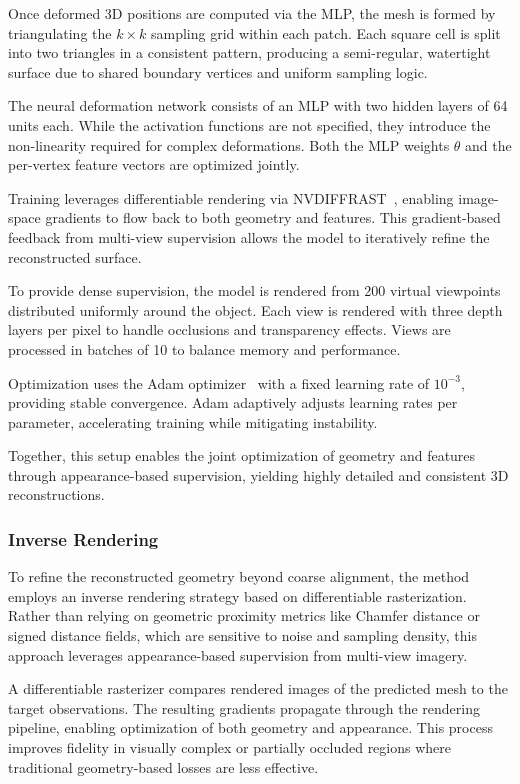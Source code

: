 Once deformed 3D positions are computed via the MLP, the mesh is formed by triangulating the $k \times k$ sampling grid within each patch.
Each square cell is split into two triangles in a consistent pattern, producing a semi-regular, watertight surface due to shared boundary vertices and uniform sampling logic.

The neural deformation network consists of an MLP with two hidden layers of 64 units each.
While the activation functions are not specified, they introduce the non-linearity required for complex deformations.
Both the MLP weights $\theta$ and the per-vertex feature vectors are optimized jointly.

Training leverages differentiable rendering via NVDIFFRAST~\cite{niemeyer2020}, enabling image-space gradients to flow back to both geometry and features.
This gradient-based feedback from multi-view supervision allows the model to iteratively refine the reconstructed surface.

To provide dense supervision, the model is rendered from 200 virtual viewpoints distributed uniformly around the object.
Each view is rendered with three depth layers per pixel to handle occlusions and transparency effects.
Views are processed in batches of 10 to balance memory and performance.

Optimization uses the Adam optimizer~\cite{kingma2017} with a fixed learning rate of $10^{-3}$, providing stable convergence.
Adam adaptively adjusts learning rates per parameter, accelerating training while mitigating instability.

Together, this setup enables the joint optimization of geometry and features through appearance-based supervision, yielding highly detailed and consistent 3D reconstructions.





\subsubsection{Inverse Rendering}

To refine the reconstructed geometry beyond coarse alignment, the method employs an inverse rendering strategy based on differentiable rasterization.
Rather than relying on geometric proximity metrics like Chamfer distance or signed distance fields, which are sensitive to noise and sampling density, this approach leverages appearance-based supervision from multi-view imagery.

A differentiable rasterizer compares rendered images of the predicted mesh to the target observations.
The resulting gradients propagate through the rendering pipeline, enabling optimization of both geometry and appearance.
This process improves fidelity in visually complex or partially occluded regions where traditional geometry-based losses are less effective.

